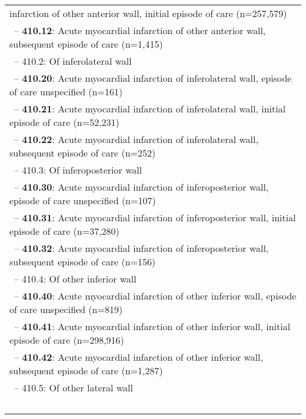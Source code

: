 \begin{longtable}{p{\textwidth}}
infarction of other anterior wall, initial episode of care (n=257,579)} \\ \-\ \hspace{40pt}\footnotesize{-- {\color{ForestGreen} \textbf{410.12}}: Acute myocardial infarction of other anterior wall, subsequent episode of care (n=1,415)} \\ \-\ \hspace{30pt}\footnotesize{-- 410.2: Of inferolateral wall} \\ \-\ \hspace{40pt}\footnotesize{-- {\color{ForestGreen} \textbf{410.20}}: Acute myocardial infarction of inferolateral wall, episode of care unspecified (n=161)} \\ \-\ \hspace{40pt}\footnotesize{-- {\color{ForestGreen} \textbf{410.21}}: Acute myocardial infarction of inferolateral wall, initial episode of care (n=52,231)} \\ \-\ \hspace{40pt}\footnotesize{-- {\color{ForestGreen} \textbf{410.22}}: Acute myocardial infarction of inferolateral wall, subsequent episode of care (n=252)} \\ \-\ \hspace{30pt}\footnotesize{-- 410.3: Of inferoposterior wall} \\ \-\ \hspace{40pt}\footnotesize{-- {\color{ForestGreen} \textbf{410.30}}: Acute myocardial infarction of inferoposterior wall, episode of care unspecified (n=107)} \\ \-\ \hspace{40pt}\footnotesize{-- {\color{ForestGreen} \textbf{410.31}}: Acute myocardial infarction of inferoposterior wall, initial episode of care (n=37,280)} \\ \-\ \hspace{40pt}\footnotesize{-- {\color{ForestGreen} \textbf{410.32}}: Acute myocardial infarction of inferoposterior wall, subsequent episode of care (n=156)} \\ \-\ \hspace{30pt}\footnotesize{-- 410.4: Of other inferior wall} \\ \-\ \hspace{40pt}\footnotesize{-- {\color{ForestGreen} \textbf{410.40}}: Acute myocardial infarction of other inferior wall, episode of care unspecified (n=819)} \\ \-\ \hspace{40pt}\footnotesize{-- {\color{ForestGreen} \textbf{410.41}}: Acute myocardial infarction of other inferior wall, initial episode of care (n=298,916)} \\ \-\ \hspace{40pt}\footnotesize{-- {\color{ForestGreen} \textbf{410.42}}: Acute myocardial infarction of other inferior wall, subsequent episode of care (n=1,287)} \\ \-\ \hspace{30pt}\footnotesize{-- 410.5: Of other lateral wall} \\ \-\ \hspace{40pt}\footnotesize{-- {\color{ForestGreen} \textbf{410.50}}: Acute 
\end{longtable}
